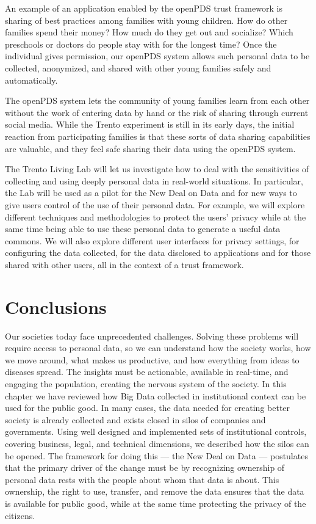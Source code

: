 An example of an application enabled by the openPDS trust framework is sharing of best practices among families with young children.
How do other families spend their money?
How much do they get out and socialize?
Which preschools or doctors do people stay with for the longest time?
Once the individual gives permission, our openPDS system allows such personal data to be collected, anonymized, and shared with other young families safely and automatically.

The openPDS system lets the community of young families learn from each other without the work of entering data by hand or the risk of sharing through current social media.
While the Trento experiment is still in its early days, the initial reaction from participating families is that these sorts of data sharing capabilities are valuable, and they feel safe sharing their data using the openPDS system.

The Trento Living Lab will let us investigate how to deal with the sensitivities of collecting and using deeply personal data in real-world situations.
In particular, the Lab will be used as a pilot for the New Deal on Data and for new ways to give users control of the use of their personal data.
For example, we will explore different techniques and methodologies to protect the users’ privacy while at the same time being able to use these personal data to generate a useful data commons. 
We will also explore different user interfaces for privacy settings, for configuring the data collected, for the data disclosed to applications and for those shared with other users, all in the context of a trust framework.

\section{Conclusions}

Our societies today face unprecedented challenges.
Solving these problems will require access to personal data, so we can understand how the society works, how we move around, what makes us productive, and how everything from ideas to diseases spread.  
The insights must be actionable, available in real-time, and engaging the population, creating the nervous system of the society.
In this chapter we have reviewed how Big Data collected in institutional context can be used for the public good.
In many cases, the data needed for creating better society is already collected and exists closed in silos of companies and governments.
Using well designed and implemented sets of institutional controls, covering business, legal, and technical dimensions, we described how the silos can be opened.
The framework for doing this --- the New Deal on Data --- postulates that the primary driver of the change must be by recognizing  ownership of personal data rests with the people about whom that data is about.
This ownership, the right to use, transfer, and remove the data ensures that the data is available for public good, while at the same time protecting the privacy of the citizens.

